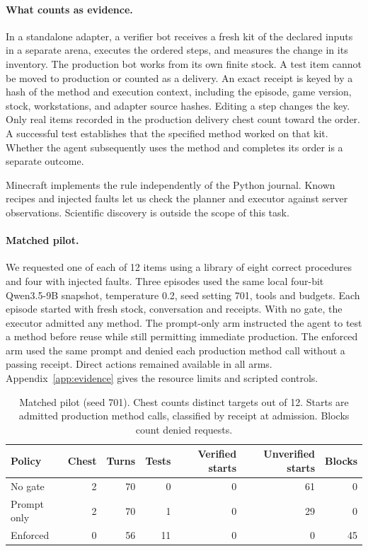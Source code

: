 \documentclass{article}
\begin{document}
\paragraph{What counts as evidence.}
In a standalone adapter, a verifier bot receives a fresh kit of the declared inputs in a separate arena, executes the ordered steps, and measures the change in its inventory. The production bot works from its own finite stock. A test item cannot be moved to production or counted as a delivery. An exact receipt is keyed by a hash of the method and execution context, including the episode, game version, stock, workstations, and adapter source hashes. Editing a step changes the key. Only real items recorded in the production delivery chest count toward the order. A successful test establishes that the specified method worked on that kit. Whether the agent subsequently uses the method and completes its order is a separate outcome.

Minecraft implements the rule independently of the Python journal. Known recipes and injected faults let us check the planner and executor against server observations. Scientific discovery is outside the scope of this task.

\paragraph{Matched pilot.}
We requested one of each of 12 items using a library of eight correct procedures and four with injected faults. Three episodes used the same local four-bit Qwen3.5-9B snapshot, temperature 0.2, seed setting 701, tools and budgets. Each episode started with fresh stock, conversation and receipts. With no gate, the executor admitted any method. The prompt-only arm instructed the agent to test a method before reuse while still permitting immediate production. The enforced arm used the same prompt and denied each production method call without a passing receipt. Direct actions remained available in all arms. Appendix~\ref{app:evidence} gives the resource limits and scripted controls.

\begin{table}[tb]
\centering\small
\caption{Matched pilot (seed 701). Chest counts distinct targets out of 12. Starts are admitted production method calls, classified by receipt at admission. Blocks count denied requests.}
\label{tab:episodes}
\begin{tabular}{lrrrrrr}
\toprule
Policy & Chest & Turns & Tests & Verified starts & Unverified starts & Blocks\\
\midrule
No gate & 2 & 70 & 0 & 0 & 61 & 0\\
Prompt only & 2 & 70 & 1 & 0 & 29 & 0\\
Enforced & 0 & 56 & 11 & 0 & 0 & 45\\
\bottomrule
\end{tabular}
\end{table}
\end{document}
